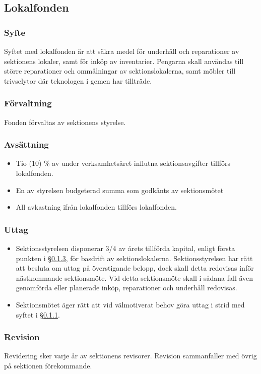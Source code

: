 \documentclass{dtek}
\begin{document}
\subsection{Lokalfonden}
\subsubsection{Syfte}
\label{sec:lokalfond_syfte}
Syftet med lokalfonden är att säkra medel för underhåll och reparationer av sektionens lokaler, samt för inköp av inventarier. Pengarna skall användas till större reparationer och ommålningar av sektionslokalerna, samt möbler till trivselytor där teknologen i gemen har tillträde.
\subsubsection{Förvaltning}
Fonden förvaltas av sektionens styrelse.
\subsubsection{Avsättning}
\label{sec:lokalfond_avsattning}
\begin{itemize}
\item Tio (10) \% av under verksamhetsåret influtna sektionsavgifter tillförs lokalfonden.
\item En av styrelsen budgeterad summa som godkänts av sektionsmötet
\item All avkastning ifrån lokalfonden tillförs lokalfonden.
\end{itemize}
\subsubsection{Uttag}
\begin{itemize}
\item Sektionsstyrelsen disponerar 3/4 av årets tillförda kapital,
enligt första punkten i §\ref{sec:lokalfond_avsattning}, för basdrift av sektionslokalerna. Sektionsstyrelsen har rätt att besluta om uttag på överstigande belopp, dock skall detta redovisas inför nästkommande sektionsmöte. Vid detta sektionsmöte skall i sådana fall även genomförda eller planerade inköp, reparationer och underhåll redovisas.
\item Sektionsmötet äger rätt att vid välmotiverat behov göra uttag i strid med syftet i §\ref{sec:lokalfond_syfte}.
\end{itemize}
\subsubsection{Revision}
Revidering sker varje år av sektionens revisorer. Revision
sammanfaller med övrig på sektionen förekommande.
\end{document}
